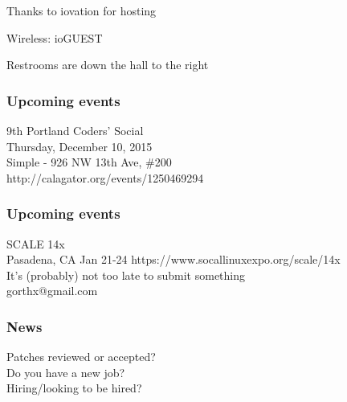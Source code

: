 \documentclass{beamer}
\begin{document}

\frame
{
  \begin{center}
  \item[]Thanks to iovation for hosting
  \item[]Wireless: ioGUEST
  \item[]Restrooms are down the hall to the right
  \end{center}
}


\frame
{
  \frametitle{Upcoming events}
  \begin{center}
{\large 9th Portland Coders' Social\\}
Thursday, December 10, 2015\\
Simple - 926 NW 13th Ave, \#200 \\
http://calagator.org/events/1250469294
  \end{center}
}

\frame
{
  \frametitle{Upcoming events}
  \begin{center}
{\large SCALE 14x\\}
Pasadena, CA Jan 21-24
https://www.socallinuxexpo.org/scale/14x\\
\vspace{5mm}
It's (probably) not too late to submit something\\
gorthx@gmail.com
  \end{center}
}

\frame
{
  \frametitle{News}
  \begin{center}
Patches reviewed or accepted?\\
Do you have a new job?\\
Hiring/looking to be hired?\\
  \end{center}
}
\end{document}
